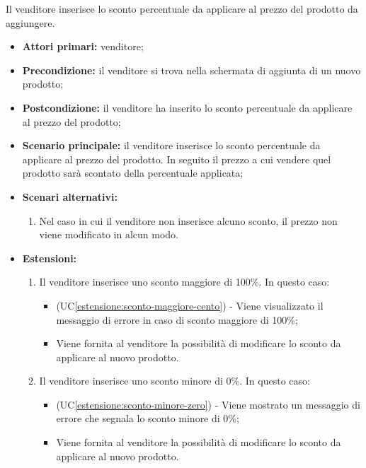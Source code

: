 Il venditore inserisce lo sconto percentuale da applicare al prezzo del prodotto da aggiungere.
\begin{itemize}
    \item \textbf{Attori primari:} venditore;
    \item \textbf{Precondizione:} il venditore si trova nella schermata di aggiunta di un nuovo prodotto;
    \item \textbf{Postcondizione:} il venditore ha inserito lo sconto percentuale da applicare al prezzo del prodotto;
    \item \textbf{Scenario principale:} il venditore inserisce lo sconto percentuale da applicare al prezzo del prodotto. In seguito il prezzo a cui vendere quel prodotto sarà scontato della percentuale applicata;
    \item \textbf{Scenari alternativi:}
    \begin{enumerate}[label=\lett]
    	\item Nel caso in cui il venditore non inserisce alcuno sconto, il prezzo non viene modificato in alcun modo.
    \end{enumerate}
    \item \textbf{Estensioni:}
    \begin{enumerate}[label=\lett]
    	\item Il venditore inserisce uno sconto maggiore di 100\%. In questo caso:
    	\begin{itemize}
    		\item (UC\ref{estensione:sconto-maggiore-cento}) - Viene visualizzato il messaggio di errore in caso di sconto maggiore di 100\%;
    		\item Viene fornita al venditore la possibilità di modificare lo sconto da applicare al nuovo prodotto.
    	\end{itemize}
    	\item Il venditore inserisce uno sconto minore di 0\%. In questo caso:
    	\begin{itemize}
    		\item (UC\ref{estensione:sconto-minore-zero}) - Viene mostrato un messaggio di errore che segnala lo sconto minore di 0\%;
    		\item Viene fornita al venditore la possibilità di modificare lo sconto da applicare al nuovo prodotto.
    	\end{itemize}
    \end{enumerate}
\end{itemize}

\label{aggiunta-prodotto.quantita}

